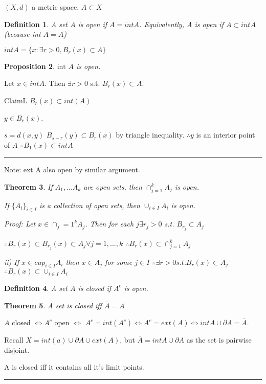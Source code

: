 \documentclass[twoside]{article}
\newcounter{lecnum}
\newcommand{\intr}{\text{int }}
\newtheorem{theorem}{Theorem}[lecnum]
\newtheorem{proposition}[theorem]{Proposition}
\newtheorem{definition}[theorem]{Definition}
\newenvironment{proof}{{\bf Proof:}}{\hfill\rule{2mm}{2mm}}
\begin{document}
$(X,d) $ a metric space, $A \subset X$
\begin{definition}
    A set $A$ is open if $A = int A$.
    Equivalently, A is open if $A \subset int A$ (because int $A = A$)

    $int A = \{x : \exists r > 0 , B_r(x) \subset A\}$
\end{definition}

\begin{proposition}
    $\intr A$ is open.  
\end{proposition}

\begin{proof}
    Let $x \in int A$. Then $\exists r > 0$ s.t. $B_r(x) \subset A$.

    ClaimL $B_r(x) \subset int(A)$

    $y \in B_r(x)$.

    $s = d(x,y)$
    $B_{s-r} (y) \subset B_r (x) $ by triangle inequality. 
    $\therefore y$ is an interior point of $A$
    $\therefore B_1(x) \subset int A$
\end{proof}

Note: ext A also open by similar argument. 

\begin{theorem}
    If $A_1, ... A_k$ are open sets, then $\cap_{j=1}^{k}A_j $ is open. 

    If $\{A_i\}_{i \in I}$ is a collection of open sets, then $\cup_{i \in I} A_i$ is open. 

    Proof: Let $x \in \cap_j=1^k A_j$. Then for each $j \exists r_j > 0$ s.t. $B_{r_j} \subset A_j$

    $\therefore B_r(x) \subset B_{r_j}(x) \subset A_j \forall j=1, ..., k$
    $\therefore B_r(x) \subset \cap_{j=1}^{k}A_j$

    ii) If $x \in cup_{i\in I}A_i$ then $x \in A_j$ for some $j \in I$
    $\therefore \exists r> 0 s.t. B_r(x) \subset A_j$
    $\therefore B_r(x) \subset \cup_{i \in I} A_i$

\end{theorem}

\begin{definition}
    A set $A$ is closed if $A^c$ is open. 
\end{definition}

\begin{theorem}
    A set is closed iff $\bar A  = A$
\end{theorem}

\begin{proof}
    $A$ closed $\iff A^c $ open $\iff$ $A^c = int (A^c) \iff A^c = ext (A) \iff int A \cup \partial A = \bar A$.

    Recall $X = int (a) \cup \partial A \cup ext (A)$, but $\bar A = int A \cup \partial A$ as the set is pairwise disjoint. 

    A is closed iff it contains all it's limit points. 
\end{proof}
\end{document}

